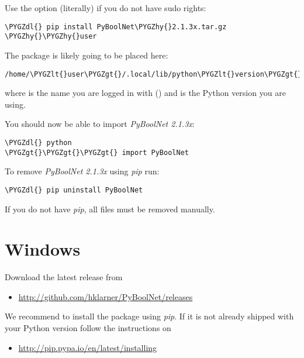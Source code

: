 \documentclass[letterpaper,10pt,english]{sphinxmanual}
\def\PYGZlt{\char`\<}
\def\PYGZgt{\char`\>}
\def\PYGZdl{\char`\$}
\def\PYGZhy{\char`\-}
\begin{document}
Use the option  (literally) if you do not have sudo rights:

\begin{Verbatim}[commandchars=\\\{\}]
\PYGZdl{} pip install PyBoolNet\PYGZhy{}2.1.3x.tar.gz \PYGZhy{}\PYGZhy{}user
\end{Verbatim}

The package is likely going to be placed here:

\begin{Verbatim}[commandchars=\\\{\}]
/home/\PYGZlt{}user\PYGZgt{}/.local/lib/python\PYGZlt{}version\PYGZgt{}/dist\PYGZhy{}packages/PyBoolNet
\end{Verbatim}

where  is the name you are logged in with () and  is the Python version you are using.

You should now be able to import \emph{PyBoolNet 2.1.3x}:

\begin{Verbatim}[commandchars=\\\{\}]
\PYGZdl{} python
\PYGZgt{}\PYGZgt{}\PYGZgt{} import PyBoolNet
\end{Verbatim}

To remove \emph{PyBoolNet 2.1.3x} using \emph{pip} run:

\begin{Verbatim}[commandchars=\\\{\}]
\PYGZdl{} pip uninstall PyBoolNet
\end{Verbatim}

If you do not have \emph{pip}, all files must be removed manually.


\section{Windows}
\label{Installation:windows}
Download the latest release from
\begin{itemize}
\item {} 
\href{http://github.com/hklarner/PyBoolNet/releases}{http://github.com/hklarner/PyBoolNet/releases}

\end{itemize}

We recommend to install the package using \emph{pip}. If it is not already shipped with your Python version follow the instructions
on
\begin{itemize}
\item {} 
\href{http://pip.pypa.io/en/latest/installing}{http://pip.pypa.io/en/latest/installing}

\end{itemize}
\end{document}
